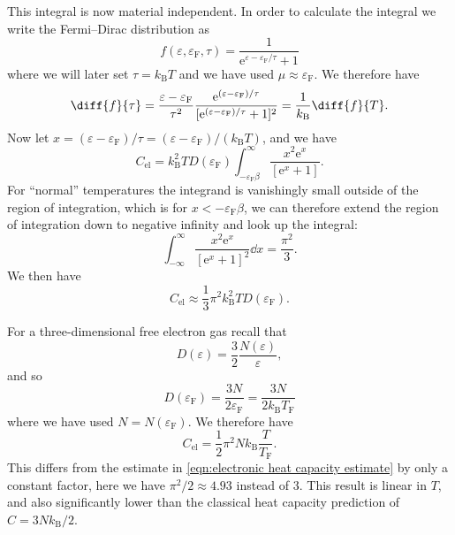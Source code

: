 \documentclass[fleqn]{NotesClass}
\newcommand*{\boltzmann}{k_{\mathrm{B}}}
\newcommand*{\e}{\mathrm{e}}
\newcommand*{\fermi}{\mathrm{F}}
\begin{document}
    This integral is now material independent.
    In order to calculate the integral we write the Fermi--Dirac distribution as
    \begin{equation}
        f(\varepsilon, \varepsilon_{\fermi}, \tau) = \frac{1}{\e^{\varepsilon - \varepsilon_{\fermi}/\tau} + 1}
    \end{equation}
    where we will later set \(\tau = \boltzmann T\) and we have used \(\mu \approx \varepsilon_{\fermi}\).
    We therefore have
    \begin{equation}
        \diff{f}{\tau} = \frac{\varepsilon - \varepsilon_{\fermi}}{\tau^2} \frac{\e^{(\varepsilon - \varepsilon_{\fermi})/\tau}}{[\e^{(\varepsilon - \varepsilon_{\fermi})/\tau} + 1]^2} = \frac{1}{\boltzmann} \diff{f}{T}.
    \end{equation}
    Now let \(x = (\varepsilon - \varepsilon_{\fermi})/\tau = (\varepsilon - \varepsilon_{\fermi})/(\boltzmann T)\), and we have
    \begin{equation}
        C_{\mathrm{el}} = \boltzmann^2 TD(\varepsilon_{\fermi}) \int_{-\varepsilon_{\fermi}\beta}^{\infty} \frac{x^2\e^{x}}{[\e^{x} + 1]}.
    \end{equation}
    For \enquote{normal} temperatures the integrand is vanishingly small outside of the region of integration, which is for \(x < -\varepsilon_{\fermi}\beta\), we can therefore extend the region of integration down to negative infinity and look up the integral:
    \begin{equation}
        \int_{-\infty}^{\infty} \frac{x^2\e^{x}}{[\e^{x} + 1]^2} \dd{x} = \frac{\pi^2}{3}.
    \end{equation}
    We then have
    \begin{equation}
        C_{\mathrm{el}} \approx \frac{1}{3}\pi^2\boltzmann^2 TD(\varepsilon_{\fermi}).
    \end{equation}

    For a three-dimensional free electron gas recall that
    \begin{equation}
        D(\varepsilon) = \frac{3}{2}\frac{N(\varepsilon)}{\varepsilon},
    \end{equation}
    and so
    \begin{equation}
        D(\varepsilon_{\fermi}) = \frac{3N}{2\varepsilon_{\fermi}} = \frac{3N}{2\boltzmann T_{\fermi}}
    \end{equation}
    where we have used \(N = N(\varepsilon_{\fermi})\).
    We therefore have
    \begin{equation}
        C_{\mathrm{el}} = \frac{1}{2}\pi^2 N\boltzmann \frac{T}{T_{\fermi}}.
    \end{equation}
    This differs from the estimate in \cref{eqn:electronic heat capacity estimate} by only a constant factor, here we have \(\pi^2/2 \approx 4.93\) instead of 3.
    This result is linear in \(T\), and also significantly lower than the classical heat capacity prediction of \(C = 3N\boltzmann /2\).
        
\end{document}
